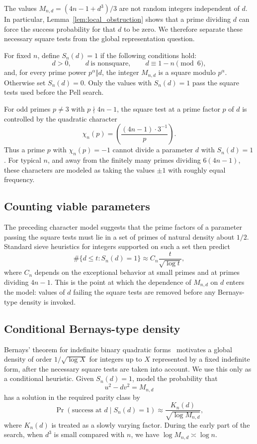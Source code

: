 \documentclass{mcom-l}
\theoremstyle{definition}
\theoremstyle{remark}
\numberwithin{equation}{section}
\begin{document}
The values $M_{n,d}=(4n-1+d^3)/3$ are not random integers independent of
$d$.  In particular, Lemma~\ref{lem:local_obstruction} shows that a prime
dividing $d$ can force the success probability for that $d$ to be zero.  We
therefore separate these necessary square tests from the global
representation question.

For fixed $n$, define $S_n(d)=1$ if the following conditions hold:
\[
        d>0,\qquad d\ \text{is nonsquare},\qquad
        d\equiv 1-n\pmod6,
\]
and, for every prime power $p^\alpha\Vert d$, the integer $M_{n,d}$ is a
square modulo $p^\alpha$.  Otherwise set $S_n(d)=0$.  Only the values with
$S_n(d)=1$ pass the square tests used before the Pell search.

For odd primes $p\neq3$ with $p\nmid 4n-1$, the square test at a prime
factor $p$ of $d$ is controlled by the quadratic character
\[
        \chi_n(p)=
        \left(\frac{(4n-1)\cdot 3^{-1}}{p}\right).
\]
Thus a prime $p$ with $\chi_n(p)=-1$ cannot divide a parameter $d$ with
$S_n(d)=1$.  For typical $n$, and away from the finitely many primes
dividing $6(4n-1)$, these characters are modeled as taking the values
$\pm1$ with roughly equal frequency.

\subsection{Counting viable parameters}
\label{subsec:counting_viable}

The preceding character model suggests that the prime factors of a
parameter passing the square tests must lie in a set of primes of natural
density about $1/2$.  Standard sieve heuristics for integers supported on
such a set then predict
\[
        \#\{d\leq t:S_n(d)=1\}
        \approx C_n \frac{t}{\sqrt{\log t}},
\]
where $C_n$ depends on the exceptional behavior at small primes and at
primes dividing $4n-1$.  This is the point at which the dependence of
$M_{n,d}$ on $d$ enters the model: values of $d$ failing the square tests
are removed before any Bernays-type density is invoked.

\subsection{Conditional Bernays-type density}
\label{subsec:conditional_bernays}

Bernays' theorem for indefinite binary quadratic forms~\cite{Bernays1912}
motivates a global density of order $1/\sqrt{\log X}$ for integers up to
$X$ represented by a fixed indefinite form, after the necessary square tests
are taken into account.  We use this only as a conditional heuristic.  Given
$S_n(d)=1$, model the probability that
\[
        u^2-d v^2=M_{n,d}
\]
has a solution in the required parity class by
\[
        \Pr(\text{success at }d\mid S_n(d)=1)
        \approx \frac{K_n(d)}{\sqrt{\log M_{n,d}}},
\]
where $K_n(d)$ is treated as a slowly varying factor.  During the early part
of the search, when $d^3$ is small compared with $n$, we have
$\log M_{n,d}\asymp\log n$.
\end{document}
